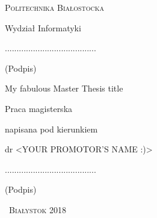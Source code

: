 \begin{titlepage}
	
	\begin{center}
		{\scshape 
			{\large Politechnika Białostocka}\par
			\vspace{0.5cm}
			{\large Wydział Informatyki}\par
			\vfill
			{\large <YOUR NAME>}\par
			\vspace{0.4cm}
			.......................................\\
			\begin{small}
				\vspace{-0.2cm}
				(Podpis)  
			\end{small}\par	
			\vspace{2cm}
			{\LARGE
				My fabulous Master Thesis title\par
			}
			\vspace{4cm}
		}
		\begin{flushright}
			{\large
				Praca magisterska\par
				napisana pod kierunkiem\par
				dr <YOUR PROMOTOR'S NAME :)>\par
				\vspace{0.4cm}
				.......................................\\
				\begin{small}
					\vspace{-0.2cm}
					(Podpis)\hspace{1.63cm}    
				\end{small}				   
			}
		\end{flushright}
		\vfill
		{\scshape\large\ Białystok 2018}
	\end{center}
	
	
\end{titlepage}
